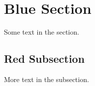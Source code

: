 \documentclass{article}
\begin{document}
\section{Blue Section}
Some text in the section.
\subsection{Red Subsection}
More text in the subsection.
\end{document}
